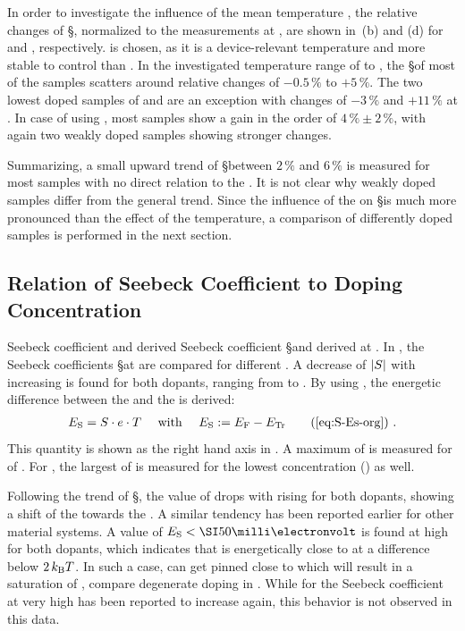 In order to investigate the influence of the mean temperature \Tm, the relative changes of \S, normalized to the measurements at \Tm[40], are shown in \,(b) and (d) for \CrPd and \WPd, respectively. \Tm[40] is chosen, as it is a device-relevant temperature and more stable to control than \Tm[30]. In the investigated temperature range of \Tm[30] to , the \S of most of the \CrPd samples scatters around relative changes of $-0.5\,\%$ to $+5\,\%$. The two lowest doped samples of \C[0.0020] and  are an exception with changes of $-3\,\%$ and $+11\,\%$ at \Tm[70]. In case of using \WPd, most samples show a gain in the order of $4\,\%\pm2\,\%$, with again two weakly doped samples showing stronger changes.

Summarizing, a small upward trend of \S between $2\,\%$ and $6\,\%$ is measured for most samples with no direct relation to the \CLong. It is not clear why weakly doped samples differ from the general trend.
Since the influence of the \CLong on \S is much more pronounced than the effect of the temperature, a comparison of differently doped samples is performed in the next section.

\subsection{Relation of Seebeck Coefficient to Doping Concentration}%
\label{sec:ResPd-S-MR}
%
{Seebeck coefficient and derived \EsLong}
{Seebeck coefficient \S and derived \EsLongL at \Tm[40].
}
%
In , the Seebeck coefficients \S at \Tm[40] are compared for different \CLongs. A decrease of $|\S|$ with increasing \C is found for both dopants, ranging from  to .
By using , the energetic difference \Es between the \EfLong \Ef and the \EtLong \Et is derived:
\begin{align}
 \Es =\S \cdot e \cdot \T \quad \text{ with } \quad\Es := \Ef - \Et
\tag{\ref{eq:S-Es-org}}
\PUNKT
\end{align}
This quantity is shown as the right hand axis in . A maximum of \Es[-183] is measured for \C[0.002] of \CrPd. For \WPd, the largest \Es of  is measured for the lowest concentration (\C[0.004]) as well.

Following the trend of \S, the value of \Es drops with rising \C for both dopants, showing a shift of the \EfLong \Ef towards the \EtLong \Et. A similar tendency has been reported earlier for other material systems\cite{Nollau2000}.
%
A value of \mbox{$\Es<\meV{50}$} is found at high \C for both dopants, which indicates that \Ef is energetically close to \Et at a difference below \mbox{$2\,k_\text{B}T$}. In such a case, \Ef can get pinned close to \Et which will result in a saturation of \Es, compare degenerate doping in .
While for \CSCs the Seebeck coefficient at very high \CLongs has been reported to increase again\cite{Ikeda2010}, this behavior is not observed in this data.

